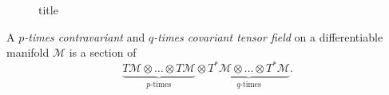 \begin{figure}[H]
	\centering
	\caption{title}
	\label{fig:vector-bundle}
\end{figure}

\begin{definition}
	A \emph{\(p\)-times contravariant} and \emph{\(q\)-times covariant tensor field} on a differentiable manifold \(\mathcal{M} \) is a section of
	\[
		\underbrace{T\mathcal{M} \otimes \ldots \otimes T\mathcal{M}}_{\text{\(p\)-times}} \otimes \underbrace{T^{\ast} \mathcal{M} \otimes \ldots \otimes T^{\ast} \mathcal{M}}_{\text{\(q\)-times}}.
	\]
\end{definition}

